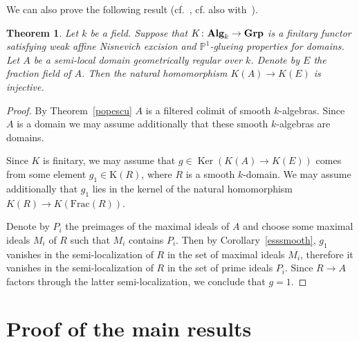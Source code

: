 \documentclass[oneside, 11pt]{amsart}
\numberwithin{equation}{section}
\newtheorem{theorem}[lemma]{Theorem}
\newcommand{\Ker}{\mathop{\mathrm{Ker}}\nolimits}
\theoremstyle{definition}
\theoremstyle{definition}
\theoremstyle{remark}
\newcommand{\catname}[1]{{\normalfont\textbf{#1}}} %
\begin{document}
We can also prove the following result (cf.~\cite[Th{\'e}or{\`e}me~1.1]{CTO92}, cf. also with~\cite[Proposition~2.2]{AHW20}).
\begin{theorem}\label{thm:gb}
Let $k$ be a field.
Suppose that $K\colon\catname{Alg}_k\rightarrow\catname{Grp}$
is a finitary functor satisfying weak affine Nisnevich excision and $\mathbb{P}^1$-glueing properties for domains. 
Let $A$ be a semi-local domain geometrically regular over $k$. 
Denote by $E$ the fraction field of $A$.
Then the natural homomorphism $K(A) \to K(E)$ is injective.
\end{theorem}
\begin{proof}
By Theorem~\ref{popescu} $A$ is a filtered colimit of smooth $k$-algebras. Since $A$ is a domain we may assume additionally that these smooth $k$-algebras are domains.

Since $K$ is finitary, we may assume that $g \in \Ker(K(A) \to K(E))$ comes from some element $g_1\in\mathrm K(R)$, where $R$ is a smooth $k$-domain. We may assume additionally that $g_1$ lies in the kernel of the natural homomorphism $K(R) \to K(\mathrm{Frac}(R))$.

Denote by $P_i$ the preimages of the maximal ideals of $A$ and choose some maximal ideals $M_i$ of $R$ such that $M_i$ contains $P_i$. Then by Corollary~\ref{esssmooth}, $g_1$ vanishes in the semi-localization of $R$ in the set of maximal ideals $M_i$, therefore it vanishes in the semi-localization of $R$ in the set of prime ideals $P_i$. Since $R\rightarrow A$ factors through the latter semi-localization, we conclude that $g=1$. 
\end{proof}

\section{Proof of the main results} \label{sec:main-results}
\end{document}
